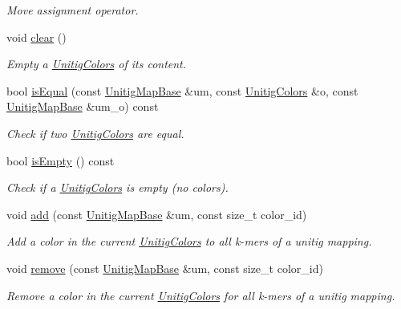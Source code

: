 \begin{DoxyCompactItemize}
\begin{DoxyCompactList}\small\item\em Move assignment operator. \end{DoxyCompactList}\item 
\mbox{\label{classUnitigColors_a5a2723ca4914c4db05630fef8fa1e665}} 
void \hyperlink{classUnitigColors_a5a2723ca4914c4db05630fef8fa1e665}{clear} ()
\begin{DoxyCompactList}\small\item\em Empty a \hyperlink{classUnitigColors}{Unitig\+Colors} of its content. \end{DoxyCompactList}\item 
bool \hyperlink{classUnitigColors_a242276ed4b9198fd1718f0c2692af9e5}{is\+Equal} (const \hyperlink{structUnitigMapBase}{Unitig\+Map\+Base} \&um, const \hyperlink{classUnitigColors}{Unitig\+Colors} \&o, const \hyperlink{structUnitigMapBase}{Unitig\+Map\+Base} \&um\+\_\+o) const
\begin{DoxyCompactList}\small\item\em Check if two \hyperlink{classUnitigColors}{Unitig\+Colors} are equal. \end{DoxyCompactList}\item 
bool \hyperlink{classUnitigColors_a8211a4472374f696433df782d30a8ee2}{is\+Empty} () const
\begin{DoxyCompactList}\small\item\em Check if a \hyperlink{classUnitigColors}{Unitig\+Colors} is empty (no colors). \end{DoxyCompactList}\item 
void \hyperlink{classUnitigColors_aefd6309649156f4a1035f8381270d225}{add} (const \hyperlink{structUnitigMapBase}{Unitig\+Map\+Base} \&um, const size\+\_\+t color\+\_\+id)
\begin{DoxyCompactList}\small\item\em Add a color in the current \hyperlink{classUnitigColors}{Unitig\+Colors} to all k-\/mers of a unitig mapping. \end{DoxyCompactList}\item 
void \hyperlink{classUnitigColors_a31e28cb0fdb60ba373af28bab79cce40}{remove} (const \hyperlink{structUnitigMapBase}{Unitig\+Map\+Base} \&um, const size\+\_\+t color\+\_\+id)
\begin{DoxyCompactList}\small\item\em Remove a color in the current \hyperlink{classUnitigColors}{Unitig\+Colors} for all k-\/mers of a unitig mapping. \end{DoxyCompactList}\item 

\end{DoxyCompactItemize}
